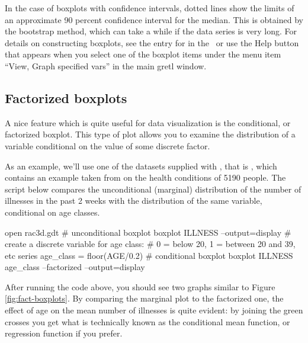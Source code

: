 In the case of boxplots with confidence intervals, dotted lines show
the limits of an approximate 90 percent confidence interval for the
median.  This is obtained by the bootstrap method, which can take a
while if the data series is very long. For details on constructing
boxplots, see the entry for  in the \GCR\, or use the
\textsf{Help} button that appears when you select one of the boxplot
items under the menu item ``View, Graph specified vars'' in the main
gretl window.

\subsection{Factorized boxplots}

A nice feature which is quite useful for data visualization is the
conditional, or factorized boxplot.  This type of plot allows you to
examine the distribution of a variable conditional on the value of
some discrete factor.

As an example, we'll use one of the datasets supplied with
, that is , which contains an example taken from
\cite{cameron-trivedi13} on the health conditions of 5190 people. The
script below compares the unconditional (marginal) distribution of the
number of illnesses in the past 2 weeks with the distribution of the
same variable, conditional on age classes.

\begin{scode}
open rac3d.gdt
# unconditional boxplot
boxplot ILLNESS --output=display
# create a discrete variable for age class: 
# 0 = below 20, 1 = between 20 and 39, etc
series age_class = floor(AGE/0.2)
# conditional boxplot
boxplot ILLNESS age_class --factorized --output=display
\end{scode}

After running the code above, you should see two graphs similar to
Figure \ref{fig:fact-boxplots}. By comparing the marginal plot to
the factorized one, the effect of age on the mean number of illnesses
is quite evident: by joining the green crosses you get what is
technically known as the conditional mean function, or regression
function if you prefer.

